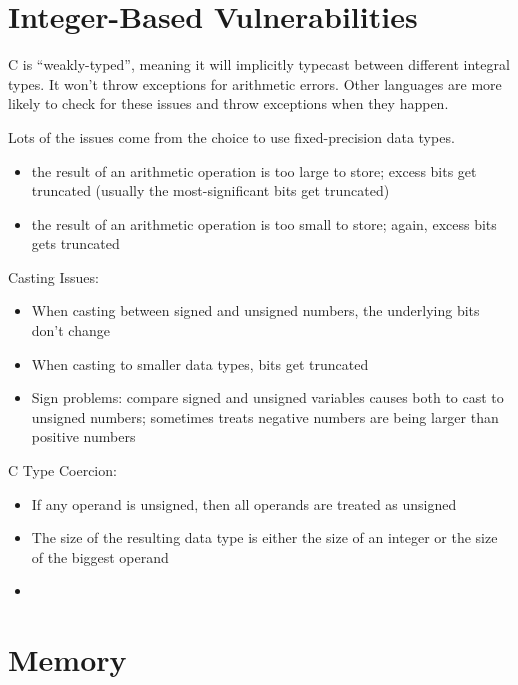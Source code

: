\documentclass[code]{amznotes}
\begin{document}
\section{Integer-Based Vulnerabilities}

C is ``weakly-typed'', meaning it will implicitly typecast between different integral types. It won't throw exceptions for arithmetic errors. Other languages are more likely to check for these issues and throw exceptions when they happen.

Lots of the issues come from the choice to use fixed-precision data types.
\begin{itemize}
    \item {} the result of an arithmetic operation is too large to store; excess bits get truncated (usually the most-significant bits get truncated)
    \item {} the result of an arithmetic operation is too small to store; again, excess bits gets truncated
\end{itemize}

Casting Issues:
\begin{itemize}
    \item When casting between signed and unsigned numbers, the underlying bits don't change
    \item When casting to smaller data types, bits get truncated
    \item Sign problems: compare signed and unsigned variables causes both to cast to unsigned numbers; sometimes treats negative numbers are being larger than positive numbers
\end{itemize}

C Type Coercion:
\begin{itemize}
    \item If any operand is unsigned, then all operands are treated as unsigned
    \item The size of the resulting data type is either the size of an integer or the size of the biggest operand
    \item {}
\end{itemize}

\section{Memory}
\end{document}
